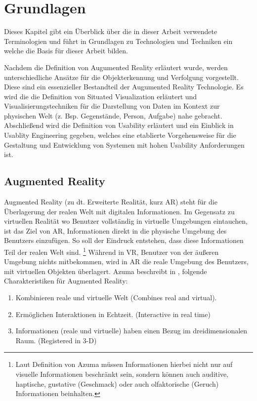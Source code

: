 \chapter{Grundlagen}

Dieses Kapitel gibt ein Überblick über die in dieser Arbeit verwendete Terminologien und führt in Grundlagen zu Technologien und Techniken ein welche die Basis für dieser Arbeit bilden. 

Nachdem die Definition von Augumented Reality erläutert wurde, werden unterschiedliche Ansätze für die Objekterkennung und Verfolgung vorgestellt.  
Diese sind ein essenzieller Bestandteil der Augumented Reality Technologie. Es wird die die Definition von Situated Visualization erläutert und Visualisierungstechniken für die Darstellung von Daten im Kontext zur physischen Welt (z. Bsp. Gegenstände, Person, Aufgabe) nahe gebracht. Abschließend wird die Definition von Usability erläutert und ein Einblick in Usablity Engineering gegeben, welches eine etablierte Vorgehensweise für die Gestaltung und Entwicklung von Systemen mit hohen Usability Anforderungen ist. 

\section{Augmented Reality}

Augmented Reality (zu dt. Erweiterte Realität, kurz AR) steht für die Überlagerung der realen Welt mit digitalen Informationen. \cite{Azuma.1997,DieterSchmalstieg2016} Im Gegensatz zu virtuellen Realität wo Benutzer vollständig in virtuelle Umgebungen eintauchen,
ist das Ziel von AR, Informationen direkt in die physische Umgebung des Benutzers einzufügen. So soll der Eindruck entstehen, dass diese Informationen Teil der realen Welt sind. \footnote{ Laut Definition von Azuma  müssen Informationen hierbei nicht nur auf visuelle Informationen beschränkt sein, 
sondern können auch auditive, haptische, gustative (Geschmack) oder auch olfaktorische (Geruch) Informationen beinhalten.} \cite{Azuma.1997} Während in VR, Benutzer von der äußeren Umgebung nichts mitbekommen, wird in AR die reale Umgebung des Benutzers, mit virtuellen 
Objekten überlagert. Azuma beschreibt in \cite{Azuma.1997}, folgende Charakteristiken für Augmented Reality: 

\begin{enumerate}
	\item Kombinieren reale und virtuelle Welt (Combines real and virtual).
	\item Ermöglichen Interaktionen in Echtzeit. (Interactive in real time)
	\item Informationen (reale und virtuelle) haben einen Bezug im dreidimensionalen Raum. (Registered in 3-D)
\end{enumerate}

